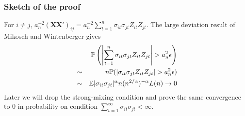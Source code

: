 \documentclass{beamer}
\renewcommand{\P}{
\mathbb P
}
\begin{document}
\begin{frame}
  \frametitle{Sketch of the proof}
  For $i \neq j$, $    a_n^{-2} (\mathbf{XX'})_{ij} = a_n^{-2} \sum_{t=1}^n
  \sigma_{it} \sigma_{jt} Z_{it} Z_{jt}$. The large deviation result
  of Mikosch and Wintenberger gives
  \begin{eqnarray*}
    && \P\left(
      \left|\sum_{t=1}^n \sigma_{it} \sigma_{jt} Z_{it} Z_{jt}\right| > a_n^2 \epsilon
    \right) \\
    &\sim& n \P(|\sigma_{it} \sigma_{jt} Z_{it} Z_{jt}| > a_n^2
    \epsilon) \\
    &\sim& \E |\sigma_{it} \sigma_{jt}|^\alpha n
    (n^{2/\alpha})^{-\alpha} L(n) \to 0
  \end{eqnarray*}
Later we will drop the strong-mixing condition and prove the same
convergence to 0 in probability on condition $\sum_{t=1}^\infty
\sigma_{it} \sigma_{jt} < \infty$.
\end{frame}


\end{document}
